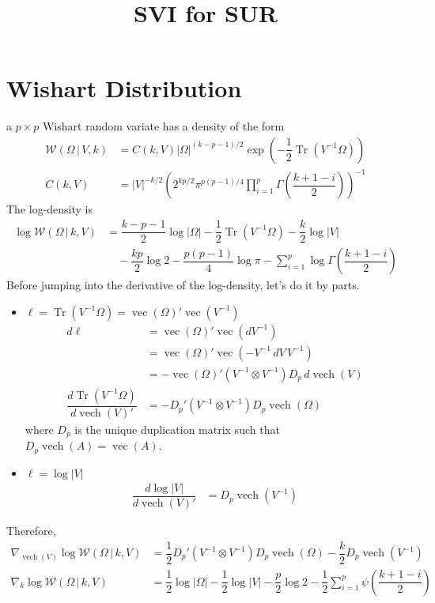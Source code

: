 \documentclass[12pt]{article}
\DeclareMathOperator{\Tr}{Tr}
\DeclareMathOperator{\vvv}{vec}
\DeclareMathOperator{\vvvh}{vech}
\begin{document}
\title{SVI for SUR}

\section{Wishart Distribution}
  a $p\times p$ Wishart random variate has a density of the form
  \begin{align}
    \mathcal{W}\left(\Omega\,|\,V,k\right) &= C(k,V)|\Omega|^{(k-p-1)/2}\exp\left(-\dfrac{1}{2}\Tr\left(V^{-1}\Omega\right)\right)\\
    C(k,V) &= |V|^{-k/2}\left(2^{kp/2}\pi^{p(p-1)/4}\prod_{i=1}^{p}\Gamma\left(\dfrac{k+1-i}{2}\right)\right)^{-1}
  \end{align}
  The log-density is
  \begin{align}
    \log\mathcal{W}\left(\Omega\,|\,k,V\right) &= \dfrac{k-p-1}{2}\log|\Omega|-\dfrac{1}{2}\Tr\left(V^{-1}\Omega\right)-\dfrac{k}{2}\log|V|\\
    &\quad -\dfrac{kp}{2}\log 2-\dfrac{p(p-1)}{4}\log \pi -\sum_{i=1}^{p}\log\Gamma\left(\dfrac{k+1-i}{2}\right)
  \end{align}
  Before jumping into the derivative of the log-density, let's do it by parts.
  \begin{itemize}
    \item $\ell=\Tr\left(V^{-1}\Omega\right)=\vvv(\Omega)'\vvv\left(V^{-1}\right)$
    \begin{align}
      d\ell &= \vvv(\Omega)'\vvv\left(dV^{-1}\right)\\
            &= \vvv(\Omega)'\vvv\left(-V^{-1}\,dV\,V^{-1}\right)\\
            &= -\vvv(\Omega)'\left(V^{-1}\otimes V^{-1}\right)D_{p}\,d\vvvh\left(V\right)\\
      \dfrac{d \Tr\left(V^{-1}\Omega\right)}{d\vvvh(V)'} &= -D_{p}'\left(V^{-1}\otimes V^{-1}\right)D_{p}\vvvh(\Omega)
    \end{align}
    where $D_{p}$ is the unique duplication matrix such that $D_{p}\vvvh(A)=\vvv(A)$.
    \item $\ell=\log|V|$
    \begin{align}
      \dfrac{d\log|V|}{d\vvvh(V)'} &= D_{p}\vvvh\left(V^{-1}\right)
    \end{align}
  \end{itemize}
  Therefore,
  \begin{align}
    \nabla_{\vvvh(V)}\log\mathcal{W}(\Omega\,|\,k,V) &= \dfrac{1}{2}D_{p}'\left(V^{-1}\otimes V^{-1}\right)D_{p}\vvvh(\Omega)-\dfrac{k}{2}D_{p}\vvvh\left(V^{-1}\right)\\
    \nabla_{k}\log\mathcal{W}(\Omega\,|\,k,V) &= \dfrac{1}{2}\log|\Omega|-\dfrac{1}{2}\log|V|-\dfrac{p}{2}\log 2-\dfrac{1}{2}\sum_{i=1}^{p}\psi\left(\dfrac{k+1-i}{2}\right)
  \end{align}
\end{document}
